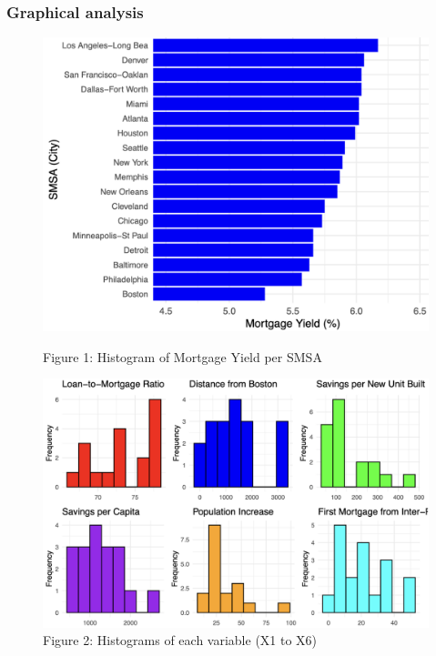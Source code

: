 \documentclass[
  12pt,
]{article}
\begin{document}
\subsubsection{Graphical analysis}\label{graphical-analysis}

\begin{figure}[H]
\centering

\begin{minipage}[t]{0.45\textwidth}
\centering
\includegraphics[width=1.1\linewidth]{figures/Figure 1.png}
\captionsetup{font=normalsize}
\caption*{Figure 1: Histogram of Mortgage Yield per SMSA}
\end{minipage}
\hfill
\begin{minipage}[t]{0.45\textwidth}
\centering
\vspace{-6cm}
\includegraphics[width=1.1\linewidth]{figures/Figure 2.png}
\captionsetup{font=normalsize}
\caption*{Figure 2: Histograms of each variable (X1 to X6)}
\end{minipage}

\end{figure}
\vspace{-0.5cm}
\end{document}
